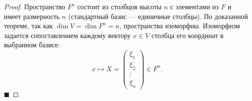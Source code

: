 \begin{proof}
Пространство $F^n$ состоит из столбцов высоты $n$ с элементами из $F$ и имеет размерность $n$ (стандартный базис --- единичные столбцы). По доказанной теореме, так как $\dim V = \dim F^n = n$, пространства изоморфны. Изоморфизм задается сопоставлением каждому вектору $x \in V$ столбца его координат в выбранном базисе:
\[
x \mapsto X = \begin{pmatrix} \xi_1 \\ \xi_2 \\ \vdots \\ \xi_n \end{pmatrix} \in F^n.
\]
\hfill$\blacksquare$
\end{proof}
